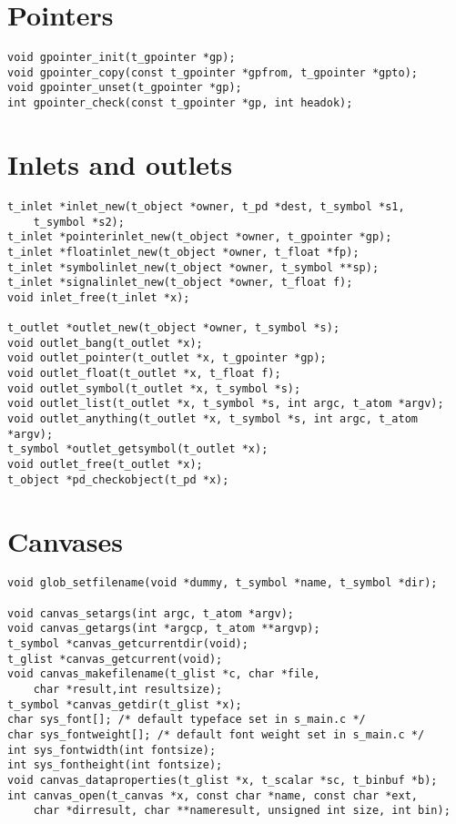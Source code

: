 \section{Pointers}
\begin{lstlisting}
void gpointer_init(t_gpointer *gp);
void gpointer_copy(const t_gpointer *gpfrom, t_gpointer *gpto);
void gpointer_unset(t_gpointer *gp);
int gpointer_check(const t_gpointer *gp, int headok);
\end{lstlisting}

\section{Inlets and outlets}
\begin{lstlisting}
t_inlet *inlet_new(t_object *owner, t_pd *dest, t_symbol *s1,
    t_symbol *s2);
t_inlet *pointerinlet_new(t_object *owner, t_gpointer *gp);
t_inlet *floatinlet_new(t_object *owner, t_float *fp);
t_inlet *symbolinlet_new(t_object *owner, t_symbol **sp);
t_inlet *signalinlet_new(t_object *owner, t_float f);
void inlet_free(t_inlet *x);

t_outlet *outlet_new(t_object *owner, t_symbol *s);
void outlet_bang(t_outlet *x);
void outlet_pointer(t_outlet *x, t_gpointer *gp);
void outlet_float(t_outlet *x, t_float f);
void outlet_symbol(t_outlet *x, t_symbol *s);
void outlet_list(t_outlet *x, t_symbol *s, int argc, t_atom *argv);
void outlet_anything(t_outlet *x, t_symbol *s, int argc, t_atom *argv);
t_symbol *outlet_getsymbol(t_outlet *x);
void outlet_free(t_outlet *x);
t_object *pd_checkobject(t_pd *x);
\end{lstlisting}

\section{Canvases}
\begin{lstlisting}
void glob_setfilename(void *dummy, t_symbol *name, t_symbol *dir);

void canvas_setargs(int argc, t_atom *argv);
void canvas_getargs(int *argcp, t_atom **argvp);
t_symbol *canvas_getcurrentdir(void);
t_glist *canvas_getcurrent(void);
void canvas_makefilename(t_glist *c, char *file,
    char *result,int resultsize);
t_symbol *canvas_getdir(t_glist *x);
char sys_font[]; /* default typeface set in s_main.c */
char sys_fontweight[]; /* default font weight set in s_main.c */
int sys_fontwidth(int fontsize);
int sys_fontheight(int fontsize);
void canvas_dataproperties(t_glist *x, t_scalar *sc, t_binbuf *b);
int canvas_open(t_canvas *x, const char *name, const char *ext,
    char *dirresult, char **nameresult, unsigned int size, int bin);
\end{lstlisting}

